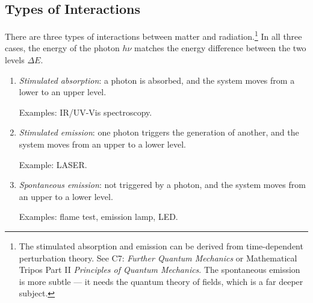 \documentclass{article}
\theoremstyle{plain}\theoremheaderfont{\normalfont\itshape}\theorembodyfont{\rmfamily}\theoremseparator{.}\newtheorem*{rem}{Remark}\newtheorem*{ex}{Example}\newtheorem*{proof}{Proof}\newtheorem*{altp}{Alternative proof}
\theoremstyle{plain}\theoremheaderfont{\normalfont\bfseries}\theorembodyfont{\rmfamily}\theoremseparator{.}\newtheorem{thm}{Theorem}[section]\newtheorem{lem}[thm]{Lemma}\newtheorem{prop}[thm]{Proposition}\newtheorem*{cor}{Corollary}\newtheorem{defn}[thm]{Definition}\newtheorem{clm}[thm]{Claim}\newtheorem{clminproof}{Claim}\newtheorem{pos}{Postulate}[section]
\theoremstyle{break}\theoremheaderfont{\normalfont\itshape}\theorembodyfont{\rmfamily}\theoremseparator{.\medskip}\newtheorem*{proofskip}{Proof}\newtheorem*{exs}{Examples}\newtheorem*{rems}{Remarks}
\theoremstyle{break}\theoremheaderfont{\normalfont\bfseries}\theorembodyfont{\rmfamily}\theoremseparator{.\medskip}\newtheorem{lemskip}[thm]{Lemma}\newtheorem{defnskip}[thm]{Definition}\newtheorem{propskip}[thm]{Proposition}\newtheorem{thmskip}[thm]{Theorem}
\numberwithin{equation}{section}
\begin{document}
    \subsection{Types of Interactions}
    There are three types of interactions between matter and radiation.\footnote{The stimulated absorption and emission can be derived from time-dependent perturbation theory. See C7: \textit{Further Quantum Mechanics} or Mathematical Tripos Part II \textit{Principles of Quantum Mechanics}. The spontaneous emission is more subtle --- it needs the quantum theory of fields, which is a far deeper subject.} In all three cases, the energy of the photon \(h\nu\) matches the energy difference between the two levels \(\Delta E\).
    \begin{figure}[ht!]
        \centering
    \end{figure}
    \begin{enumerate}[topsep=0pt,label=(\roman*)]
        \item \textit{Stimulated absorption}: a photon is absorbed, and the system moves from a lower to an upper level.
        
        Examples: IR/UV-Vis spectroscopy.
        \item \textit{Stimulated emission}: one photon triggers the generation of another, and the system moves from an upper to a lower level.
        
        Example: LASER.
        \item \textit{Spontaneous emission}: not triggered by a photon, and the system moves from an upper to a lower level.
        
        Examples: flame test, emission lamp, LED.
    \end{enumerate}
\end{document}
